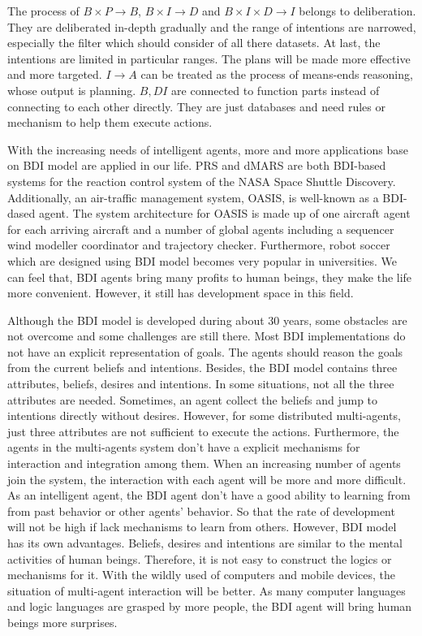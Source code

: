 The process of $B \times P \to B$, $B \times I \to D$ and $B \times I \times D \to I$ belongs to deliberation. They are deliberated in-depth gradually and the range of intentions are narrowed, especially the filter which should consider of all there datasets. At last, the intentions are limited in particular ranges. The plans will be made more effective and more targeted.  $I \to A $ can be treated as the process of means-ends reasoning, whose output is planning. $B,D I$ are connected to function parts instead of connecting to each other directly. They are just databases and need rules or mechanism to help them execute actions.

With the increasing needs of intelligent agents, more and more applications base on BDI model are applied in our life. PRS and dMARS are both BDI-based systems for the reaction control system of the NASA Space Shuttle Discovery. Additionally, an air-traffic management system, OASIS, is well-known as a BDI-dased agent. The system architecture for OASIS is made up of one aircraft agent for each arriving aircraft and a number of global agents including a sequencer wind modeller coordinator and trajectory checker\cite{Rao_BDITheory_1995}. Furthermore, robot soccer which are designed using BDI model becomes very popular in universities. We can feel that, BDI agents bring many profits to human beings, they make the life more convenient. However, it still has development space in this field.

Although the BDI model is developed during about 30 years, some obstacles are not overcome and some challenges are still there. Most BDI implementations do not have an explicit representation of goals. The agents should reason the goals from the current beliefs and intentions. Besides, the BDI model contains three attributes, beliefs, desires and intentions. In some situations, not all the three attributes are needed. Sometimes, an agent collect the beliefs and jump to intentions directly without desires. However, for some distributed multi-agents, just three attributes are not sufficient to execute the actions.  Furthermore, the agents in the multi-agents system don't have a explicit mechanisms for interaction and integration among them. When an increasing number of agents join the system, the interaction with each agent will be more and more difficult. As an intelligent agent, the BDI agent don't have a good ability to learning from from past behavior or other agents’ behavior. So that the rate of development will not be high if lack mechanisms to learn from others. However, BDI model has its own advantages. Beliefs, desires and intentions are similar to the mental activities of human beings. Therefore, it is not easy to construct the logics or mechanisms for it. With the wildly used of computers and mobile devices, the situation of multi-agent interaction will be better. As many computer languages and logic languages are grasped by more people, the BDI agent will bring human beings more surprises.

